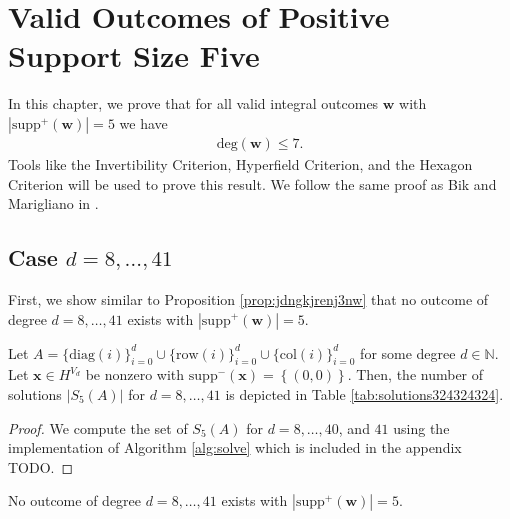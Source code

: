 \chapter{Valid Outcomes of Positive Support Size Five}

In this chapter, we prove that for all valid integral outcomes \( \mathbf w \) with \( |\mathrm{supp}^+(\mathbf w)| = 5 \) we have
\begin{align*}
    \mathrm{deg}(\mathbf w) \leq 7.
\end{align*}
Tools like the Invertibility Criterion, Hyperfield Criterion, and the Hexagon Criterion will be used to prove this result. We follow the same proof as Bik and Marigliano in \cite{bik2022classifying}.

\section{Case \( d = 8, \dots, 41 \)}

First, we show similar to Proposition \ref{prop:jdngkjrenj3nw} that no outcome of degree \( d = 8, \dots, 41 \) exists with \( |\mathrm{supp}^+(\mathbf w)| = 5 \).

\begin{proposition}
    Let $A = \{ \mathrm{diag}(i) \}_{i=0}^d \cup \{ \mathrm{row}(i)\}^d_{i=0} \cup \{ \mathrm{col}(i) \}^d_{i=0}$ for some degree \( d \in \mathbb{N} \). Let \( \mathbf{x} \in H^{V_d} \) be nonzero with \( \mathrm{supp}^-(\mathbf{x}) = \left\{ (0,0) \right\} \). Then, the number of solutions \( \lvert S_5(A) \rvert \) for \( d = 8, \dots, 41 \) is depicted in Table \ref{tab:solutions324324324}.
\end{proposition}

\begin{proof}
    We compute the set of \( S_5(A) \) for \( d = 8, \dots, 40 \), and \( 41 \) using the implementation of Algorithm \ref{alg:solve} which is included in the appendix TODO.
\end{proof}

\begin{proposition}\label{prop:uiwuwinca}
    No outcome of degree \( d = 8, \dots, 41 \) exists with \( |\mathrm{supp}^+(\mathbf w)| = 5 \).
\end{proposition}

